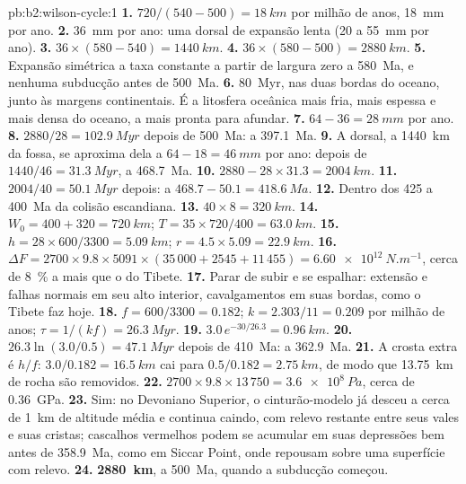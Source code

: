 \begin{solution}{pb:b2:wilson-cycle:1}
\textbf{1.} $720/(540 - 500) = \qty{18}{km}$ por milhão de anos, \qty{18}{mm} por ano.
\textbf{2.} \qty{36}{mm} por ano: uma dorsal de expansão lenta (20 a \qty{55}{mm} por ano).
\textbf{3.} $36\times(580 - 540) = \qty{1440}{km}$.
\textbf{4.} $36\times(580 - 500) = \qty{2880}{km}$.
\textbf{5.} Expansão simétrica a taxa constante a partir de largura zero a \qty{580}{Ma}, e nenhuma
subducção antes de \qty{500}{Ma}.
\textbf{6.} \qty{80}{Myr}, nas duas bordas do oceano, junto às margens continentais. É a
litosfera oceânica mais fria, mais espessa e mais densa do oceano, a mais pronta para afundar.
\textbf{7.} $64 - 36 = \qty{28}{mm}$ por ano.
\textbf{8.} $2880/28 = \qty{102.9}{Myr}$ depois de \qty{500}{Ma}: a \qty{397.1}{Ma}.
\textbf{9.} A dorsal, a \qty{1440}{km} da fossa, se aproxima dela a $64 - 18 =
\qty{46}{mm}$ por ano: depois de $1440/46 = \qty{31.3}{Myr}$, a \qty{468.7}{Ma}.
\textbf{10.} $2880 - 28\times31.3 = \qty{2004}{km}$.
\textbf{11.} $2004/40 = \qty{50.1}{Myr}$ depois: a $468.7 - 50.1 = \qty{418.6}{Ma}$.
\textbf{12.} Dentro dos 425 a \qty{400}{Ma} da colisão escandiana.
\textbf{13.} $40\times8 = \qty{320}{km}$.
\textbf{14.} $W_0 = 400 + 320 = \qty{720}{km}$; $T = 35\times720/400 = \qty{63.0}{km}$.
\textbf{15.} $h = 28\times600/3300 = \qty{5.09}{km}$; $r = 4.5\times5.09 = \qty{22.9}{km}$.
\textbf{16.} $\Delta F = 2700\times9.8\times5091\times(35\,000 + 2545 + 11\,455) =
\qty{6.60e12}{N.m^{-1}}$, cerca de \qty{8}{\percent} a mais que o do Tibete.
\textbf{17.} Parar de subir e se espalhar: extensão e falhas normais em seu alto interior,
cavalgamentos em suas bordas, como o Tibete faz hoje.
\textbf{18.} $f = 600/3300 = 0.182$; $k = 2.303/11 = 0.209$ por milhão de anos; $\tau = 1/(kf)
= \qty{26.3}{Myr}$.
\textbf{19.} $3.0\,e^{-30/26.3} = \qty{0.96}{km}$.
\textbf{20.} $26.3\ln(3.0/0.5) = \qty{47.1}{Myr}$ depois de \qty{410}{Ma}: a \qty{362.9}{Ma}.
\textbf{21.} A crosta extra é $h/f$: $3.0/0.182 = \qty{16.5}{km}$ cai para $0.5/0.182 =
\qty{2.75}{km}$, de modo que \qty{13.75}{km} de rocha são removidos.
\textbf{22.} $2700\times9.8\times13\,750 = \qty{3.6e8}{Pa}$, cerca de \qty{0.36}{GPa}.
\textbf{23.} Sim: no Devoniano Superior, o cinturão-modelo já desceu a cerca de \qty{1}{km} de altitude
média e continua caindo, com relevo restante entre seus vales e suas cristas; cascalhos vermelhos podem
se acumular em suas depressões bem antes de \qty{358.9}{Ma}, como em Siccar Point, onde repousam sobre uma superfície
com relevo.
\textbf{24.} \textbf{\qty[text-series-to-math=true]{2880}{km}}, a \qty{500}{Ma}, quando
a subducção começou.
\end{solution}
